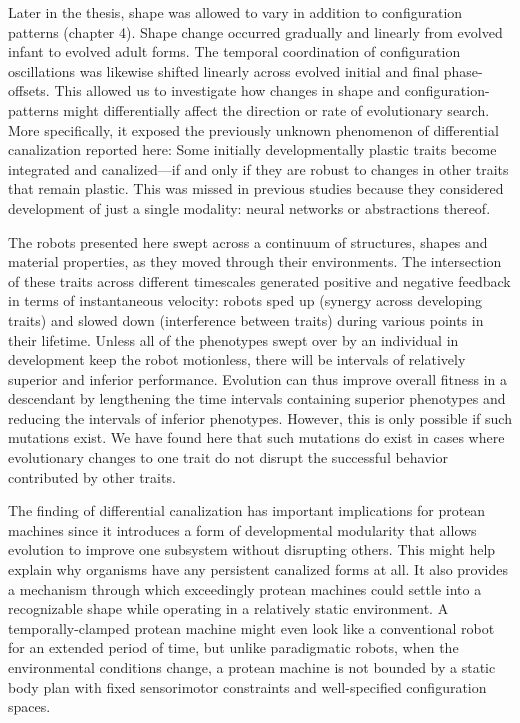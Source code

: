 Later in the thesis, shape was allowed to vary in addition to configuration patterns (chapter 4).
Shape change occurred gradually and linearly from evolved infant to evolved adult forms.
The temporal coordination of configuration oscillations was likewise shifted linearly across evolved initial and final phase-offsets.
This allowed us to investigate how changes in shape and configuration-patterns might differentially affect the direction or rate of evolutionary search.
More specifically, it exposed the previously unknown phenomenon of differential canalization reported here:
Some initially developmentally plastic traits become integrated and canalized---if and only if they are robust to changes in other traits that remain plastic.
This was missed in previous studies because they considered development of just a single modality: neural networks or abstractions thereof.

The robots presented here 
swept across a continuum of structures, shapes and material properties,
as they
moved through their environments.
The intersection of these 
traits across different timescales generated positive and negative feedback in terms of instantaneous velocity: 
robots sped up (synergy across developing traits) and slowed down (interference between traits) during various points in their lifetime.
Unless all of the phenotypes swept over by an individual in development keep the robot motionless, there will be intervals of relatively superior and inferior performance.
Evolution can thus improve overall fitness in a descendant by lengthening the time intervals containing superior phenotypes and reducing the intervals of inferior phenotypes. 
However, this is only possible if such mutations exist.
We have found here that such mutations do exist in cases where evolutionary changes
to one trait do not disrupt the successful behavior contributed
by other traits.

The finding of differential canalization has important implications
for protean machines since it introduces a form of developmental modularity
that
allows evolution to improve one subsystem without disrupting others.
This might help explain why organisms have any persistent canalized forms at all.
It also provides a mechanism through which exceedingly protean machines could settle into a recognizable shape while operating in a relatively static environment.
A temporally-clamped protean machine might even look like a conventional robot for an extended period of time, but unlike paradigmatic robots, when the environmental conditions change, a protean machine is not bounded by a static body plan with fixed sensorimotor constraints and well-specified configuration spaces.

